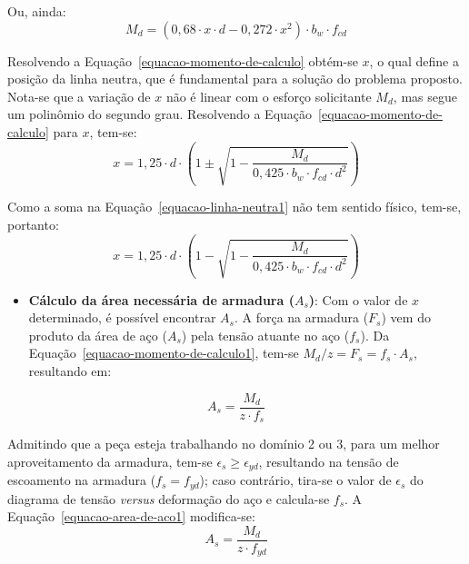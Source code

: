 Ou, ainda:
\begin{equation}
	\label{equacao-momento-de-calculo}
	M_d=(0,68\cdot x\cdot d-0,272\cdot x^2)\cdot b_w\cdot f_{cd}
\end{equation}

Resolvendo a Equação~\eqref{equacao-momento-de-calculo} obtém-se $x$, o qual define a posição da linha neutra, que é fundamental para a solução do problema proposto. Nota-se que a variação de $x$ não é linear com o esforço solicitante $M_d$, mas segue um polinômio do segundo grau. Resolvendo a Equação~\eqref{equacao-momento-de-calculo} para $x$, tem-se:
\begin{equation}
	\label{equacao-linha-neutra1}
	x=1,25\cdot d\cdot\left(1\pm\sqrt{1-\frac{M_d}{0,425\cdot b_w\cdot f_{cd}\cdot d^2}}\right)
\end{equation}

Como a soma na Equação~\eqref{equacao-linha-neutra1} não tem sentido físico, tem-se, portanto:
\begin{equation}
	\label{equacao-linha-neutra}
	x=1,25\cdot d\cdot\left(1-\sqrt{1-\frac{M_d}{0,425\cdot b_w\cdot f_{cd}\cdot d^2}}\right)
\end{equation}

\begin{itemize}
	\item \textbf{Cálculo da área necessária de armadura ($A_s$)}: Com o valor de $x$ determinado, é possível encontrar $A_s$. A força na armadura ($F_s$) vem do produto da área de aço ($A_s$) pela tensão atuante no aço ($f_s$). Da Equação~\eqref{equacao-momento-de-calculo1}, tem-se $M_d/z=F_s=f_s\cdot A_s$, resultando em:
\end{itemize}
\begin{equation}
	\label{equacao-area-de-aco1}
	A_s=\frac{M_d}{z\cdot f_s}
\end{equation}

Admitindo que a peça esteja trabalhando no domínio 2 ou 3, para um melhor aproveitamento da armadura, tem-se $\epsilon_s\geqslant\epsilon_{yd}$, resultando na tensão de escoamento na armadura ($f_s=f_{yd}$); caso contrário, tira-se o valor de $\epsilon_s$ do diagrama de tensão \textit{versus} deformação do aço e calcula-se $f_s$. A Equação~\eqref{equacao-area-de-aco1} modifica-se:
\begin{equation}
	A_s=\frac{M_d}{z\cdot f_{yd}}
\end{equation}